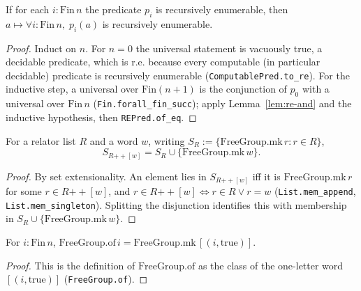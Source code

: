 \begin{lemma}
    \label{lem:re-forall-fin}
    \leanok
    If for each $i : \mathrm{Fin}\,n$ the predicate $p_i$ is recursively
    enumerable, then $a \mapsto \forall i : \mathrm{Fin}\,n,\; p_i(a)$ is
    recursively enumerable.
\end{lemma}
\begin{proof}
    Induct on $n$. For $n = 0$ the universal statement is vacuously true, a
    decidable predicate, which is r.e. because every computable (in particular
    decidable) predicate is recursively enumerable (\texttt{ComputablePred.to\_re}).
    For the inductive step, a universal over
    $\mathrm{Fin}(n+1)$ is the conjunction of $p_0$ with a universal over
    $\mathrm{Fin}\,n$ (\texttt{Fin.forall\_fin\_succ}); apply
    Lemma~\ref{lem:re-and} and the inductive hypothesis, then
    \texttt{REPred.of\_eq}.
\end{proof}

\begin{lemma}
    \label{lem:relatorSet-append}
    \leanok
    For a relator list $R$ and a word $w$, writing
    $S_R := \{\mathrm{FreeGroup.mk}\,r : r \in R\}$,
    \[
        S_{R \mathbin{+\!\!+} [w]} = S_R \cup \{\mathrm{FreeGroup.mk}\,w\}.
    \]
\end{lemma}
\begin{proof}
    By set extensionality. An element lies in $S_{R \mathbin{+\!\!+} [w]}$ iff it is
    $\mathrm{FreeGroup.mk}\,r$ for some $r \in R \mathbin{+\!\!+} [w]$, and
    $r \in R \mathbin{+\!\!+} [w] \iff r \in R \vee r = w$
    (\texttt{List.mem\_append}, \texttt{List.mem\_singleton}). Splitting the
    disjunction identifies this with membership in
    $S_R \cup \{\mathrm{FreeGroup.mk}\,w\}$.
\end{proof}

\begin{lemma}
    \label{lem:of-eq-mk-singleton}
    \leanok
    For $i : \mathrm{Fin}\,n$,
    $\mathrm{FreeGroup.of}\,i = \mathrm{FreeGroup.mk}\,[(i, \mathrm{true})]$.
\end{lemma}
\begin{proof}
    This is the definition of $\mathrm{FreeGroup.of}$ as the class of the
    one-letter word $[(i, \mathrm{true})]$ (\texttt{FreeGroup.of}).
\end{proof}

